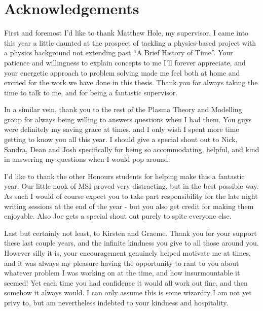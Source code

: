 
\chapter*{Acknowledgements}\label{acknowledgements}


First and foremost I'd like to thank Matthew Hole, my supervisor. I came 
into this year a little daunted at the prospect of tackling a physics-based 
project with a physics background not extending past ``A Brief History of Time''.
Your patience and willingness to explain concepts to me I'll forever appreciate, 
and your energetic approach to problem solving made me feel both at home and excited 
for the work we have done in this thesis. Thank you for always taking the time to talk to 
me, and for being a fantastic supervisor.

In a similar vein, thank you to the rest of the Plasma Theory and Modelling group for always being 
willing to answers questions when I had them. You guys were definitely my saving grace 
at times, and I only wish I spent more time getting to know you all this year. I should give 
a special shout out to Nick, Sandra, Dean and Josh specifically for being so 
accommodating, helpful, and kind in answering my questions when I would pop around. 

I'd like to thank the other Honours students for helping make this a fantastic 
year. Our little nook of MSI proved very distracting, but in the best possible 
way. As such I would of course expect you to take part responsibility for the late night 
writing sessions at the end of the year - but you also get 
credit for making them enjoyable. Also Joe gets a special shout out purely to spite everyone else.

Last but certainly not least, to Kirsten and Graeme. Thank you for your support these last 
couple years, and the infinite kindness you give to all those around you. However silly it is,
your encouragement genuinely helped motivate me at times, and it was always my pleasure having the 
opportunity to rant to you about whatever problem I was working on at the time, and how insurmountable
it seemed! Yet each time you had confidence it would all work out fine, and then somehow it always would. I can only assume 
this is some wizardry I am not yet privy to, but am nevertheless indebted to your kindness and hospitality.